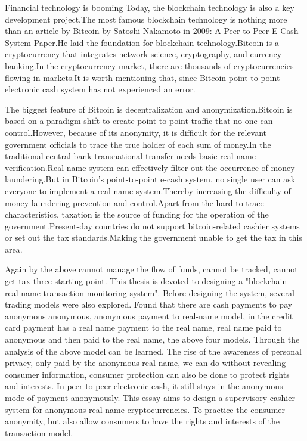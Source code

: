\begin{eabstract}
	Financial technology is booming Today, the blockchain technology is also a key development project.The most famous blockchain technology is nothing more than an article by Bitcoin by Satoshi Nakamoto in 2009: A Peer-to-Peer E-Cash System Paper.He laid the foundation for blockchain technology.Bitcoin is a cryptocurrency that integrates network science, cryptography, and currency banking.In the cryptocurrency market, there are thousands of cryptocurrencies flowing in markets.It is worth mentioning that, since Bitcoin point to point electronic cash system has not experienced an error.

	The biggest feature of Bitcoin is decentralization and anonymization.Bitcoin is based on a paradigm shift to create point-to-point traffic that no one can control.However, because of its anonymity, it is difficult for the relevant government officials to trace the true holder of each sum of money.In the traditional central bank transnational transfer needs basic real-name verification.Real-name system can effectively filter out the occurrence of money laundering.But in Bitcoin's point-to-point e-cash system, no single user can ask everyone to implement a real-name system.Thereby increasing the difficulty of money-laundering prevention and control.Apart from the hard-to-trace characteristics, taxation is the source of funding for the operation of the government.Present-day countries do not support bitcoin-related cashier systems or set out the tax standards.Making the government unable to get the tax in this area.


	Again by the above cannot manage the flow of funds, cannot be tracked, cannot get tax three starting point. This thesis is devoted to designing a "blockchain real-name transaction monitoring system". Before designing the system, several trading models were also explored. Found that there are cash payments to pay anonymous anonymous, anonymous payment to real-name model, in the credit card payment has a real name payment to the real name, real name paid to anonymous and then paid to the real name, the above four models. Through the analysis of the above model can be learned. The rise of the awareness of personal privacy, only paid by the anonymous real name, we can do without revealing consumer information, consumer protection can also be done to protect rights and interests. In peer-to-peer electronic cash, it still stays in the anonymous mode of payment anonymously. This essay aims to design a supervisory cashier system for anonymous real-name cryptocurrencies. To practice the consumer anonymity, but also allow consumers to have the rights and interests of the transaction model. 

\end{eabstract}

